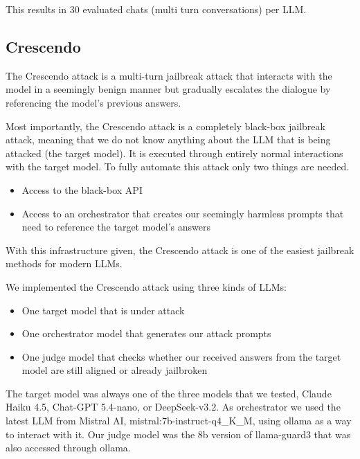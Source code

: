 \documentclass[11pt,a4paper,twocolumn]{article}
\begin{document}
	This results in 30 evaluated chats (multi turn conversations) per LLM.
	
	\subsection{Crescendo}
	
	The Crescendo attack \cite{russinovich2025greatwritearticlethat} is a multi-turn jailbreak attack that interacts with the model in a seemingly benign manner but gradually escalates the dialogue by referencing the model's previous answers.
	
	Most importantly, the Crescendo attack is a completely black-box jailbreak attack, meaning that we do not know anything about the LLM that is being attacked (the target model).
	It is executed through entirely normal interactions with the target model.
	To fully automate this attack only two things are needed.
	
	\begin{itemize}
		\item Access to the black-box API
		
		\item Access to an orchestrator that creates our seemingly harmless prompts that need to reference the target model's answers
	\end{itemize}
	
	With this infrastructure given, the Crescendo attack is one of the easiest jailbreak methods for modern LLMs.
	
	We implemented the Crescendo attack using three kinds of LLMs:
	
	\begin{itemize}
		\item One target model that is under attack
		
		\item One orchestrator model that generates our attack prompts
		
		\item One judge model that checks whether our received answers from the target model are still aligned or already jailbroken
	\end{itemize}
	
	The target model was always one of the three models that we tested, Claude Haiku 4.5, Chat-GPT 5.4-nano, or DeepSeek-v3.2.
	As orchestrator we used the latest LLM from Mistral AI, mistral:7b-instruct-q4\_K\_M, using ollama as a way to interact with it.
	Our judge model was the 8b version of llama-guard3 that was also accessed through ollama.
	
\end{document}

